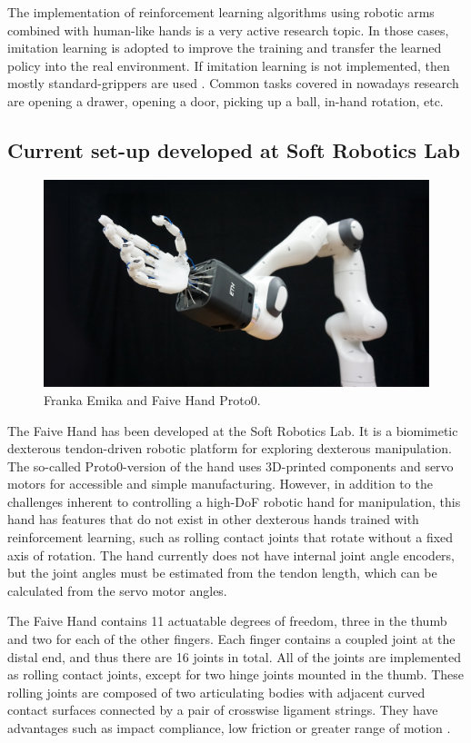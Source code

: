 \documentclass[a4paper]{article}
\begin{document}
The implementation of reinforcement learning algorithms using robotic arms combined with human-like hands is a very active research topic. In those cases, imitation learning is adopted to improve the training and transfer the learned policy into the real environment. If imitation learning is not implemented, then mostly standard-grippers are used \cite{breyer2019comparing}. Common tasks covered in nowadays research are opening a drawer, opening a door, picking up a ball, in-hand rotation, etc.
    
\subsection{Current set-up developed at Soft Robotics Lab}

\begin{figure}[!hb]
    \centering
    \includegraphics[scale=0.2]{images/4a78b0_c2490c2428ba4e19bf12687e84801176~mv2.png}
    \caption{Franka Emika and Faive Hand Proto0.}
\end{figure}

The Faive Hand has been developed at the Soft Robotics Lab. It is a biomimetic dexterous tendon-driven robotic platform for exploring dexterous manipulation. The so-called Proto0-version of the hand uses 3D-printed components and servo motors for accessible and simple manufacturing. However, in addition to the challenges inherent to controlling a high-DoF robotic hand for manipulation, this hand has features that do not exist in other dexterous hands trained with reinforcement learning, such as rolling contact joints that rotate without a fixed axis of rotation. The hand currently does not have internal joint angle encoders, but the joint angles must be estimated from the tendon length, which can be calculated from the servo motor angles.

The Faive Hand contains 11 actuatable degrees of freedom, three in the thumb and two for each of the other fingers. Each finger contains a coupled joint at the distal end, and thus there are 16 joints in total.
All of the joints are implemented as rolling contact joints, except for two hinge joints mounted in the thumb. These rolling joints are composed of two articulating bodies with adjacent curved contact surfaces connected by a pair of crosswise ligament strings. They have advantages such as impact compliance, low friction or greater range of motion \cite{toshimitsu2023getting}.
\end{document}
